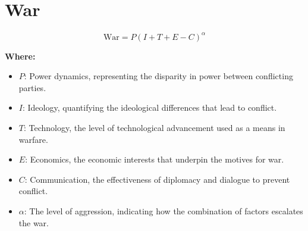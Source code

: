 \chapter{War}

\begin{equation}
\text{War} = P(I + T + E - C)^\alpha
\end{equation}

\textbf{Where:}

\begin{itemize}
    \item $P$: Power dynamics, representing the disparity in power between conflicting parties.
    \item $I$: Ideology, quantifying the ideological differences that lead to conflict.
    \item $T$: Technology, the level of technological advancement used as a means in warfare.
    \item $E$: Economics, the economic interests that underpin the motives for war.
    \item $C$: Communication, the effectiveness of diplomacy and dialogue to prevent conflict.
    \item $\alpha$: The level of aggression, indicating how the combination of factors escalates the war.
\end{itemize}